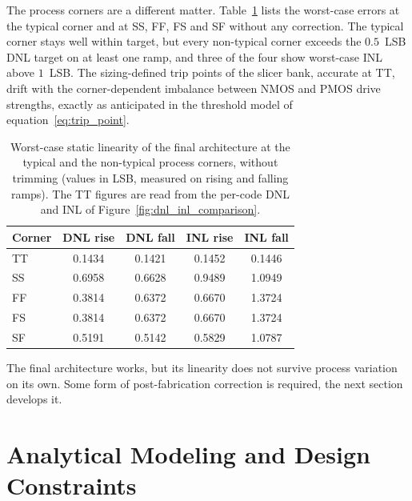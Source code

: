 The process corners are a different matter. Table~\ref{tab:untrimmed_corners} lists the worst-case errors at the typical corner and at SS, FF, FS and SF without any correction. The typical corner stays well within target, but every non-typical corner exceeds the $0.5$~LSB DNL target on at least one ramp, and three of the four show worst-case INL above $1$~LSB. The sizing-defined trip points of the slicer bank, accurate at TT, drift with the corner-dependent imbalance between NMOS and PMOS drive strengths, exactly as anticipated in the threshold model of equation~\eqref{eq:trip_point}.

\begin{table}[htbp]
    \centering
    \caption{Worst-case static linearity of the final architecture at the typical and the non-typical process corners, without trimming (values in LSB, measured on rising and falling ramps). The TT figures are read from the per-code DNL and INL of Figure~\ref{fig:dnl_inl_comparison}.}
    \label{tab:untrimmed_corners}
    \renewcommand{\arraystretch}{1.3}
    \begin{tabular}{lcccc}
        \toprule
        \textbf{Corner} & \textbf{DNL rise} & \textbf{DNL fall} & \textbf{INL rise} & \textbf{INL fall} \\
        \midrule
        TT & 0.1434 & 0.1421 & 0.1452 & 0.1446 \\
        SS & 0.6958 & 0.6628 & 0.9489 & 1.0949 \\
        FF & 0.3814 & 0.6372 & 0.6670 & 1.3724 \\
        FS & 0.3814 & 0.6372 & 0.6670 & 1.3724 \\
        SF & 0.5191 & 0.5142 & 0.5829 & 1.0787 \\
        \bottomrule
    \end{tabular}
\end{table}

The final architecture works, but its linearity does not survive process variation on its own. Some form of post-fabrication correction is required, the next section develops it.





\section{Analytical Modeling and Design Constraints}
\label{sec:analytical_modeling}

